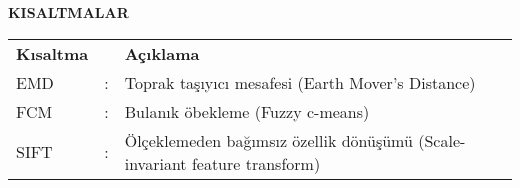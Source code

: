 \newpage
\pagestyle{plain}
\begin{center}
\textbf{KISALTMALAR}
\end{center}
\vspace{\satbos}

\begin{table}[h]
\begin{tabularx}{\textwidth}{@{}lcX@{}}
\textbf{Kısaltma} &  & \textbf{Açıklama}\\
EMD & : & Toprak taşıyıcı mesafesi (Earth Mover's Distance)\\
FCM & : & Bulanık öbekleme (Fuzzy c-means)\\
SIFT & : & Ölçeklemeden bağımsız özellik dönüşümü (Scale-invariant feature transform)\\
\end{tabularx}
\end{table}
